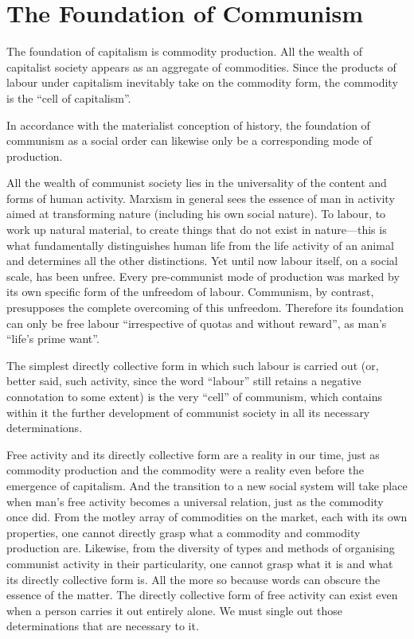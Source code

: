 \documentclass[../main]{subfiles}
\begin{document}
\ifSubfilesClassLoaded{\setcounter{page}{14}}{}
\section{The Foundation of Communism}
\label{sec:03_foundation}

The foundation of capitalism is commodity production. All the wealth of capitalist society appears as an aggregate of commodities. Since the products of labour under capitalism inevitably take on the commodity form, the commodity is the “cell of capitalism”.

In accordance with the materialist conception of history, the foundation of communism as a social order can likewise only be a corresponding mode of production.

All the wealth of communist society lies in the universality of the content and forms of human activity. Marxism in general sees the essence of man in activity aimed at transforming nature (including his own social nature). To labour, to work up natural material, to create things that do not exist in nature—this is what fundamentally distinguishes human life from the life activity of an animal and determines all the other distinctions. Yet until now labour itself, on a social scale, has been unfree. Every pre-communist mode of production was marked by its own specific form of the unfreedom of labour. Communism, by contrast, presupposes the complete overcoming of this unfreedom. Therefore its foundation can only be free labour “irrespective of quotas and without reward”, as man’s “life’s prime want”.

The simplest directly collective form in which such labour is carried out (or, better said, such activity, since the word “labour” still retains a negative connotation to some extent) is the very “cell” of communism, which contains within it the further development of communist society in all its necessary determinations.

Free activity and its directly collective form are a reality in our time, just as commodity production and the commodity were a reality even before the emergence of capitalism. And the transition to a new social system will take place when man’s free activity becomes a universal relation, just as the commodity once did. From the motley array of commodities on the market, each with its own properties, one cannot directly grasp what a commodity and commodity production are. Likewise, from the diversity of types and methods of organising communist activity in their particularity, one cannot grasp what it is and what its directly collective form is. All the more so because words can obscure the essence of the matter. The directly collective form of free activity can exist even when a person carries it out entirely alone. We must single out those determinations that are necessary to it.
\end{document}

